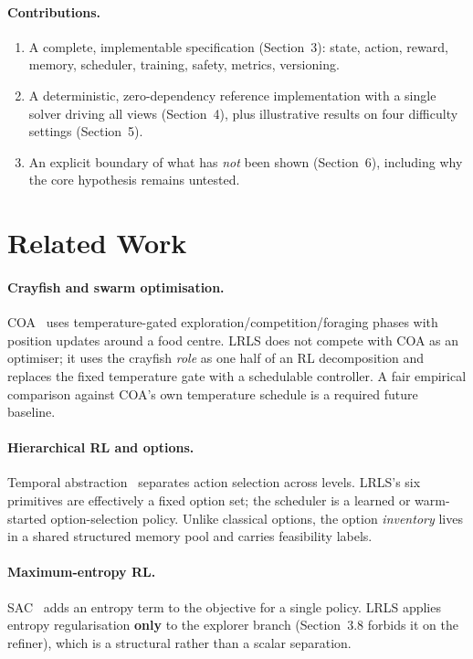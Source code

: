 \documentclass[11pt,a4paper]{article}
\begin{document}
\paragraph{Contributions.}
\begin{enumerate}
\item A complete, implementable specification (Section~3): state, action, reward, memory, scheduler, training, safety, metrics, versioning.
\item A deterministic, zero-dependency reference implementation with a single solver driving all views (Section~4), plus illustrative results on four difficulty settings (Section~5).
\item An explicit boundary of what has \emph{not} been shown (Section~6), including why the core hypothesis remains untested.
\end{enumerate}

\section{Related Work}
\paragraph{Crayfish and swarm optimisation.} COA~\cite{coa} uses temperature-gated exploration/competition/foraging phases with position updates around a food centre. LRLS does not compete with COA as an optimiser; it uses the crayfish \emph{role} as one half of an RL decomposition and replaces the fixed temperature gate with a schedulable controller. A fair empirical comparison against COA's own temperature schedule is a required future baseline.

\paragraph{Hierarchical RL and options.} Temporal abstraction~\cite{options} separates action selection across levels. LRLS's six primitives are effectively a fixed option set; the scheduler is a learned or warm-started option-selection policy. Unlike classical options, the option \emph{inventory} lives in a shared structured memory pool and carries feasibility labels.

\paragraph{Maximum-entropy RL.} SAC~\cite{sac} adds an entropy term to the objective for a single policy. LRLS applies entropy regularisation \textbf{only} to the explorer branch (Section~3.8 forbids it on the refiner), which is a structural rather than a scalar separation.
\end{document}
